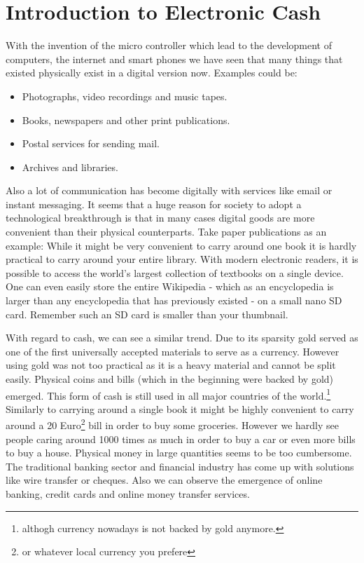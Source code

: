 \documentclass[ebook,12pt,oneside,openany]{memoir}
\begin{document}
\section{Introduction to Electronic Cash}
With the invention of the micro controller which lead to the development of computers, the internet and smart phones we have seen that many things that existed physically exist in a digital version now.
Examples could be:
\begin{itemize}
\item Photographs, video recordings and music tapes.
\item Books, newspapers and other print publications.
\item Postal services for sending mail.
\item Archives and libraries.
\end{itemize}
Also a lot of communication has become digitally with services like email or instant messaging.
It seems that a huge reason for society to adopt a technological breakthrough is that in many cases digital goods are more convenient than their physical counterparts.
Take paper publications as an example: While it might be very convenient to carry around one book it is hardly practical to carry around your entire library.
With modern electronic readers, it is possible to access the world's largest collection of textbooks on a single device.
One can even easily store the entire Wikipedia - which as an encyclopedia is larger than any encyclopedia that has previously existed - on a small nano SD card.
Remember such an SD card is smaller than your thumbnail.

With regard to cash, we can see a similar trend.
Due to its sparsity gold served as one of the first universally accepted materials to serve as a currency.
However using gold was not too practical as it is a heavy material and cannot be split easily.
Physical coins and bills (which in the beginning were backed by gold) emerged.
This form of cash is still used in all major countries of the world.\footnote{althogh currency nowadays is not backed by gold anymore.}
Similarly to carrying around a single book it might be highly convenient to carry around a 20 Euro\footnote{or whatever local currency you prefere} bill in order to buy some groceries. However we hardly see people caring around 1000 times as much in order to buy a car or even more bills to buy a house.
Physical money in large quantities seems to be too cumbersome. 
The traditional banking sector and financial industry has come up with solutions like wire transfer or cheques.
Also we can observe the emergence of online banking, credit cards and online money transfer services.
\end{document}
